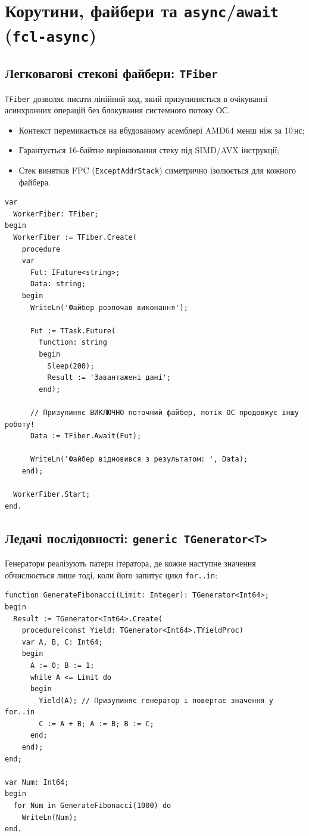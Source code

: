 \documentclass[11pt,a4paper]{article}
\begin{document}
\newpage

\section{Корутини, файбери та \texttt{async}/\texttt{await} (\texttt{fcl-async})}

\subsection{Легковагові стекові файбери: \texttt{TFiber}}
\texttt{TFiber} дозволяє писати лінійний код, який призупиняється в очікуванні асинхронних операцій без блокування системного потоку ОС.
\begin{itemize}
  \item Контекст перемикається на вбудованому асемблері AMD64 менш ніж за 10\,нс;
  \item Гарантується 16-байтне вирівнювання стеку під SIMD/AVX інструкції;
  \item Стек винятків FPC (\texttt{ExceptAddrStack}) симетрично ізолюється для кожного файбера.
\end{itemize}

\begin{lstlisting}
var
  WorkerFiber: TFiber;
begin
  WorkerFiber := TFiber.Create(
    procedure
    var
      Fut: IFuture<string>;
      Data: string;
    begin
      WriteLn('Файбер розпочав виконання');

      Fut := TTask.Future(
        function: string
        begin
          Sleep(200);
          Result := 'Завантажені дані';
        end);

      // Призупиняє ВИКЛЮЧНО поточний файбер, потік ОС продовжує іншу роботу!
      Data := TFiber.Await(Fut);

      WriteLn('Файбер відновився з результатом: ', Data);
    end);

  WorkerFiber.Start;
end.
\end{lstlisting}

\subsection{Ледачі послідовності: \texttt{generic TGenerator<T>}}
Генератори реалізують патерн ітератора, де кожне наступне значення обчислюється лише тоді, коли його запитує цикл \texttt{for..in}:

\begin{lstlisting}
function GenerateFibonacci(Limit: Integer): TGenerator<Int64>;
begin
  Result := TGenerator<Int64>.Create(
    procedure(const Yield: TGenerator<Int64>.TYieldProc)
    var A, B, C: Int64;
    begin
      A := 0; B := 1;
      while A <= Limit do
      begin
        Yield(A); // Призупиняє генератор і повертає значення у for..in
        C := A + B; A := B; B := C;
      end;
    end);
end;

var Num: Int64;
begin
  for Num in GenerateFibonacci(1000) do
    WriteLn(Num);
end.
\end{lstlisting}
\end{document}
